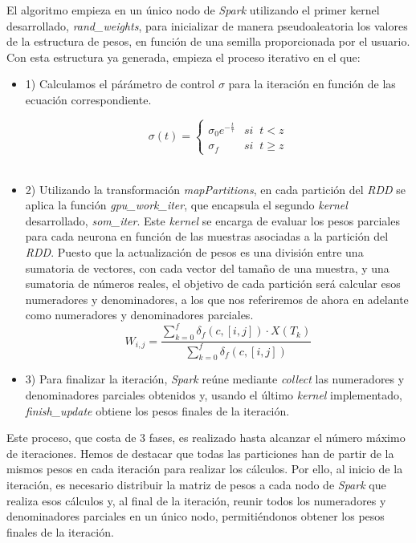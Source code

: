 El algoritmo empieza en un único nodo de \textit{Spark} utilizando el primer kernel desarrollado, \textit{rand\_weights}, para inicializar de manera pseudoaleatoria los valores de la estructura de pesos, en función de una semilla proporcionada por el usuario. Con esta estructura ya generada, empieza el proceso iterativo en el que:
\begin{itemize}
    \item 1) Calculamos el párámetro de control $\sigma$ para la iteración en función de las ecuación correspondiente.

$$\sigma(t) = \left\{
\begin{array}{ll}
\sigma_0e^{-\frac{t}{\tau}} & si \;\;t < z\\
\sigma_f & si  \;\; t\geq z
\end{array}
\right.
$$\\
    \item 2) Utilizando la transformación \textit{mapPartitions}, en cada partición del \textit{RDD} se aplica la función \textit{gpu\_work\_iter}, que encapsula el segundo  \textit{kernel} desarrollado, \textit{som\_iter}. Este \textit{kernel} se encarga de evaluar los pesos parciales para cada neurona en función de las muestras asociadas a la partición del \textit{RDD}. Puesto que la actualización de pesos es una división entre una sumatoria de vectores, con cada vector del tamaño de una muestra, y una sumatoria de números reales, el objetivo de cada partición será calcular esos numeradores y denominadores, a los que nos referiremos de ahora en adelante como numeradores y denominadores parciales.
    $$
 W_{i, j} = \frac{\sum_{k=0}^{f} \delta_f(c, [i,j]) \cdot  X(T_k) }{\sum_{k=0}^{f} \delta_f(c, [i,j])}
$$
    \item 3) Para finalizar la iteración, \textit{Spark} reúne mediante \textit{collect} las numeradores y denominadores parciales obtenidos y, usando el último \textit{kernel} implementado, \textit{finish\_update} obtiene los pesos finales de la iteración.\\
\end{itemize}

Este proceso, que costa de 3 fases, es realizado hasta alcanzar el número máximo de iteraciones. Hemos de destacar que todas las particiones han de partir de la mismos pesos en cada iteración para realizar los cálculos. Por ello, al inicio de la iteración, es necesario distribuir la matriz de pesos a cada nodo de \textit{Spark} que realiza esos cálculos y, al final de la iteración, reunir todos los numeradores y denominadores parciales en un único nodo, permitiéndonos obtener los pesos finales de la iteración. \\

